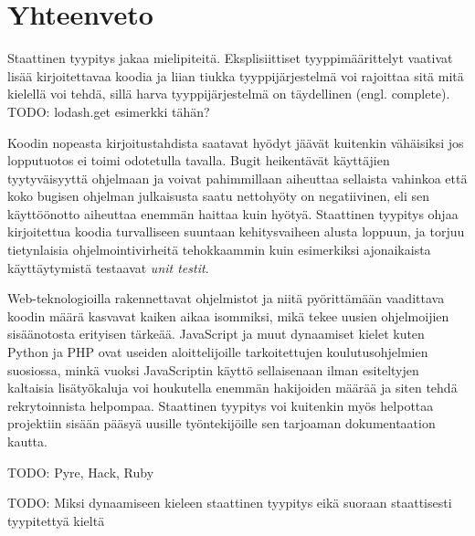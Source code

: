 \chapter{Yhteenveto}
Staattinen tyypitys jakaa mielipiteitä. Eksplisiittiset
tyyppimäärittelyt vaativat lisää kirjoitettavaa koodia ja liian tiukka
tyyppijärjestelmä voi rajoittaa sitä mitä kielellä voi tehdä, sillä harva
tyyppijärjestelmä on täydellinen (engl. complete).
TODO: lodash.get esimerkki tähän?

Koodin nopeasta kirjoitustahdista saatavat hyödyt jäävät kuitenkin vähäisiksi
jos lopputuotos ei toimi odotetulla tavalla. Bugit heikentävät käyttäjien
tyytyväisyyttä ohjelmaan ja voivat pahimmillaan aiheuttaa sellaista vahinkoa
että koko bugisen ohjelman julkaisusta saatu nettohyöty on negatiivinen, eli
sen käyttöönotto aiheuttaa enemmän haittaa kuin hyötyä. Staattinen tyypitys
ohjaa kirjoitettua koodia turvalliseen suuntaan kehitysvaiheen alusta
loppuun, ja torjuu tietynlaisia ohjelmointivirheitä tehokkaammin kuin
esimerkiksi ajonaikaista käyttäytymistä testaavat \textit{unit testit}.

Web-teknologioilla rakennettavat ohjelmistot ja niitä pyörittämään vaadittava
koodin määrä kasvavat kaiken aikaa isommiksi, mikä tekee uusien ohjelmoijien
sisäänotosta erityisen tärkeää. JavaScript ja muut dynaamiset kielet kuten
Python ja PHP ovat useiden aloittelijoille tarkoitettujen koulutusohjelmien
suosiossa, minkä vuoksi JavaScriptin käyttö sellaisenaan ilman esiteltyjen
kaltaisia lisätyökaluja voi houkutella enemmän hakijoiden määrää ja siten
tehdä rekrytoinnista helpompaa. Staattinen tyypitys voi kuitenkin myös
helpottaa projektiin sisään pääsyä uusille työntekijöille sen tarjoaman
dokumentaation kautta.

TODO: Pyre, Hack, Ruby

TODO: Miksi dynaamiseen kieleen staattinen tyypitys eikä suoraan
staattisesti tyypitettyä kieltä
